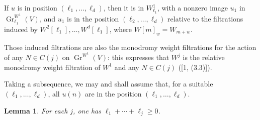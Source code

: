 \documentclass[11pt,a4paper]{article}
\theoremstyle{plain}
\newtheorem{lemma}[theorem]{Lemma}
\theoremstyle{definition}
\DeclareMathOperator{\Gr}{Gr}
\begin{document}
If $u$ is in position $(\ell_1,\dots,\ell_d)$, then it is in $W^1_{\ell_1}$, with a nonzero image $u_1$ in $\Gr_{\ell_1}^{W^1}(V)$, and $u_1$ is in the position $(\ell_2,\dots,\ell_d)$ relative to the filtrations induced by $W^2[\ell_1],\dots,W^d[\ell_1]$, where $W[m]_w=W_{m+w}$.

Those induced filtrations are also the monodromy weight filtrations for the action of any $N\in C(j)$ on $\Gr^{W^1}(V)$: this expresses that $W^j$ is the relative monodromy weight filtration of $W^1$ and any $N\in C(j)$ ([1, (3.3)]).

Taking a subsequence, we may and shall assume that, for a suitable $(\ell_1,\dots,\ell_d)$, all $u(n)$ are in the position $(\ell_1,\dots,\ell_d)$.

\begin{lemma}\label{lem:nonnegative}
For each $j$, one has $\ell_1+\cdots+\ell_j\geq 0$.
\end{lemma}
\end{document}
